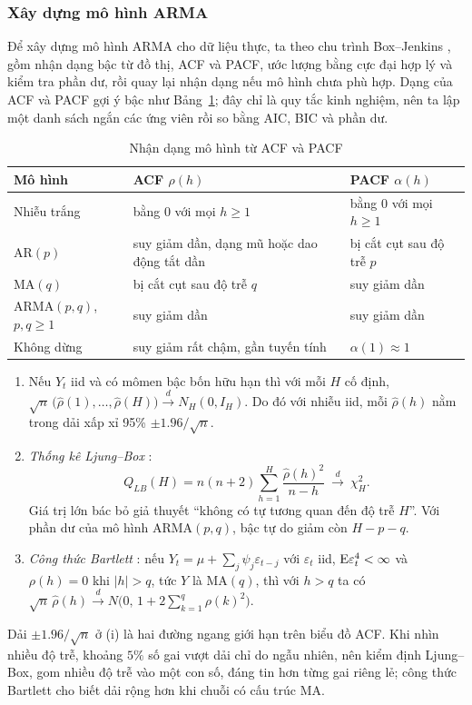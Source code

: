 \subsubsection{Xây dựng mô hình ARMA}

Để xây dựng mô hình ARMA cho dữ liệu thực, ta theo chu trình Box--Jenkins , gồm nhận dạng bậc từ đồ thị, ACF và PACF, ước lượng bằng cực đại hợp lý và kiểm tra phần dư, rồi quay lại nhận dạng nếu mô hình chưa phù hợp. Dạng của ACF và PACF gợi ý bậc như Bảng~\ref{tab:nhandang}; đây chỉ là quy tắc kinh nghiệm, nên ta lập một danh sách ngắn các ứng viên rồi so bằng AIC, BIC và phần dư.

\begin{table}[H]
\centering\small
\caption{Nhận dạng mô hình từ ACF và PACF}\label{tab:nhandang}
\renewcommand{\arraystretch}{1.25}
\begin{tabular}{|l|l|l|}
\toprule
Mô hình & ACF $\rho(h)$ & PACF $\alpha(h)$ \\
\midrule
Nhiễu trắng & bằng $0$ với mọi $h\ge1$ & bằng $0$ với mọi $h\ge1$ \\
AR$(p)$ & suy giảm dần, dạng mũ hoặc dao động tắt dần & bị cắt cụt sau độ trễ $p$ \\
MA$(q)$ & bị cắt cụt sau độ trễ $q$ & suy giảm dần \\
ARMA$(p,q)$, $p,q\ge1$ & suy giảm dần & suy giảm dần \\
Không dừng & suy giảm rất chậm, gần tuyến tính & $\alpha(1)\approx1$ \\
\bottomrule
\end{tabular}
\end{table}

\begin{kq}
\begin{enumerate}[label=(\roman*),leftmargin=*,itemsep=1pt]
\item Nếu $Y_t$ iid và có mômen bậc bốn hữu hạn thì với mỗi $H$ cố định, $\sqrt n\,\bigl(\hat\rho(1),\dots,\hat\rho(H)\bigr)\xrightarrow{d}N_H(0,I_H)$. Do đó với nhiễu iid, mỗi $\hat\rho(h)$ nằm trong dải xấp xỉ 95\% $\pm1.96/\sqrt n$.
\item \emph{Thống kê Ljung--Box} :
\[
Q_{LB}(H)=n(n+2)\sum_{h=1}^{H}\frac{\hat\rho(h)^2}{n-h}\ \xrightarrow{d}\ \chi^2_H.
\]
Giá trị lớn bác bỏ giả thuyết ``không có tự tương quan đến độ trễ $H$''. Với phần dư của mô hình ARMA$(p,q)$, bậc tự do giảm còn $H-p-q$.
\item \emph{Công thức Bartlett} : nếu $Y_t=\mu+\sum_j\psi_j\varepsilon_{t-j}$ với $\varepsilon_t$ iid, $\mathrm{E}\varepsilon_t^4<\infty$ và $\rho(h)=0$ khi $|h|>q$, tức $Y$ là MA$(q)$, thì với $h>q$ ta có $\sqrt n\,\hat\rho(h)\xrightarrow{d}N\bigl(0,\,1+2\sum_{k=1}^{q}\rho(k)^2\bigr)$.
\end{enumerate}
\end{kq}
Dải $\pm1.96/\sqrt n$ ở (i) là hai đường ngang giới hạn trên biểu đồ ACF. Khi nhìn nhiều độ trễ, khoảng $5\%$ số gai vượt dải chỉ do ngẫu nhiên, nên kiểm định Ljung--Box, gom nhiều độ trễ vào một con số, đáng tin hơn từng gai riêng lẻ; công thức Bartlett cho biết dải rộng hơn khi chuỗi có cấu trúc MA.

